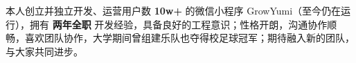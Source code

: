 

\begin{cvparagraph}
本人创立并独立开发、运营用户数 \textbf{10w+} 的微信小程序 GrowYumi（至今仍在运行），拥有 \textbf{两年全职} 开发经验，具备良好的工程意识；性格开朗，沟通协作顺畅，喜欢团队协作，大学期间曾组建乐队也夺得校足球冠军；期待融入新的团队，与大家共同进步。
\end{cvparagraph}
